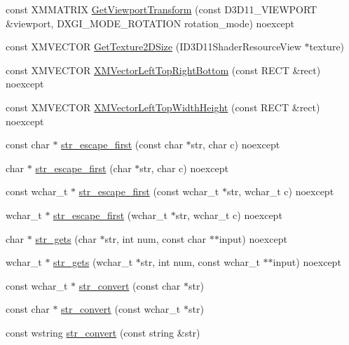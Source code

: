\begin{DoxyCompactItemize}
\item 
const X\+M\+M\+A\+T\+R\+IX \hyperlink{namespacemage_ac6eaff98567e504a9bb31a23a150231b}{Get\+Viewport\+Transform} (const D3\+D11\+\_\+\+V\+I\+E\+W\+P\+O\+RT \&viewport, D\+X\+G\+I\+\_\+\+M\+O\+D\+E\+\_\+\+R\+O\+T\+A\+T\+I\+ON rotation\+\_\+mode) noexcept
\item 
const X\+M\+V\+E\+C\+T\+OR \hyperlink{namespacemage_a32e962380f439a26629371c492643616}{Get\+Texture2\+D\+Size} (I\+D3\+D11\+Shader\+Resource\+View $\ast$texture)
\item 
const X\+M\+V\+E\+C\+T\+OR \hyperlink{namespacemage_a0003ec8e1ff669c9de7bc3894691d596}{X\+M\+Vector\+Left\+Top\+Right\+Bottom} (const R\+E\+CT \&rect) noexcept
\item 
const X\+M\+V\+E\+C\+T\+OR \hyperlink{namespacemage_abcbdb1a43e221c003f7b89863f131d11}{X\+M\+Vector\+Left\+Top\+Width\+Height} (const R\+E\+CT \&rect) noexcept
\item 
const char $\ast$ \hyperlink{namespacemage_a7e9afab57377deb2e0504fe7f10ad4bb}{str\+\_\+escape\+\_\+first} (const char $\ast$str, char c) noexcept
\item 
char $\ast$ \hyperlink{namespacemage_a39aef479a31c696f0dad3fd95909659b}{str\+\_\+escape\+\_\+first} (char $\ast$str, char c) noexcept
\item 
const wchar\+\_\+t $\ast$ \hyperlink{namespacemage_adff2fab1d0d35ecd72a1273641851fdc}{str\+\_\+escape\+\_\+first} (const wchar\+\_\+t $\ast$str, wchar\+\_\+t c) noexcept
\item 
wchar\+\_\+t $\ast$ \hyperlink{namespacemage_acdb11f09efac71de9936b8bc53ac869a}{str\+\_\+escape\+\_\+first} (wchar\+\_\+t $\ast$str, wchar\+\_\+t c) noexcept
\item 
char $\ast$ \hyperlink{namespacemage_a55d4fe3a7afd71b297a2944a982920aa}{str\+\_\+gets} (char $\ast$str, int num, const char $\ast$$\ast$input) noexcept
\item 
wchar\+\_\+t $\ast$ \hyperlink{namespacemage_ab40fc6c18ce6879c3f98a22370453b39}{str\+\_\+gets} (wchar\+\_\+t $\ast$str, int num, const wchar\+\_\+t $\ast$$\ast$input) noexcept
\item 
const wchar\+\_\+t $\ast$ \hyperlink{namespacemage_aba19c96528a59194ebc100244518f608}{str\+\_\+convert} (const char $\ast$str)
\item 
const char $\ast$ \hyperlink{namespacemage_a93f0e3b596ce1156d1fce19967fc316a}{str\+\_\+convert} (const wchar\+\_\+t $\ast$str)
\item 
const wstring \hyperlink{namespacemage_a9a7ff7b35c293ad8f09d5603f78e4c52}{str\+\_\+convert} (const string \&str)

\end{DoxyCompactItemize}
